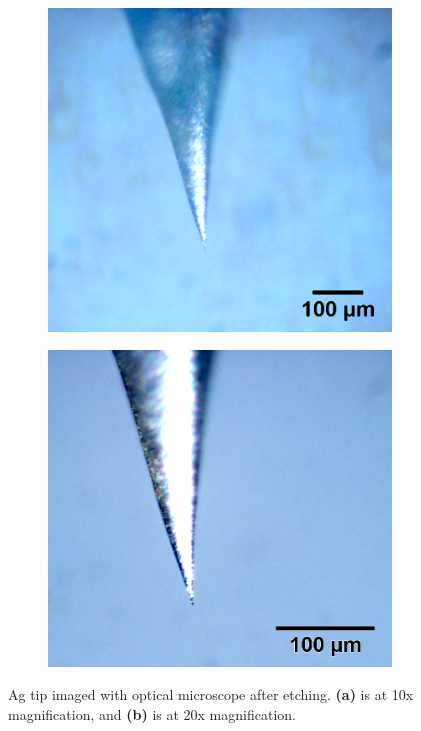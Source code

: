 \begin{figure} [H]
    \centering
    \begin{subfigure}[t]{0.35\textwidth}
    \includegraphics[width=\textwidth]{pictures/10x_meniscus_agtip_sb.png}
    \caption{}
    \end{subfigure}
    \hspace{0.5cm}
    \begin{subfigure}[t]{0.36\textwidth}
    \includegraphics[width=\textwidth]{pictures/20x_meniscus_agtip_sb.png}
    \caption{}
    \end{subfigure}
    
    \caption{Ag tip imaged with optical microscope after etching. \textbf{(a)} is at 10x magnification, and \textbf{(b)} is at 20x magnification.}
    \label{fig:expsetup:image-plasmon}
\end{figure}

